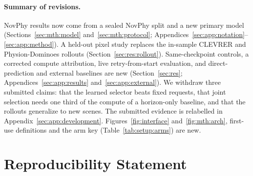 \appendix

\begin{revblock}
\paragraph{Summary of revisions.} NovPhy results now come from a sealed NovPhy split and a new primary model (Sections~\ref{sec:mth:model} and~\ref{sec:mth:protocol}; Appendices~\ref{sec:app:notation}--\ref{sec:app:method}). A held-out pixel study replaces the in-sample CLEVRER and Physion-Dominoes rollouts (Section~\ref{sec:res:rollout}). Same-checkpoint controls, a corrected compute attribution, live retry-from-start evaluation, and direct-prediction and external baselines are new (Section~\ref{sec:res}; Appendices~\ref{sec:app:results} and~\ref{sec:app:external}). We withdraw three submitted claims: that the learned selector beats fixed requests, that joint selection needs one third of the compute of a horizon-only baseline, and that the rollouts generalize to new scenes. The submitted evidence is relabelled in Appendix~\ref{sec:app:development}. Figures~\ref{fig:interface} and~\ref{fig:mth:arch}, first-use definitions and the arm key (Table~\ref{tab:setup:arms}) are new.
\end{revblock}










\section{Reproducibility Statement}


